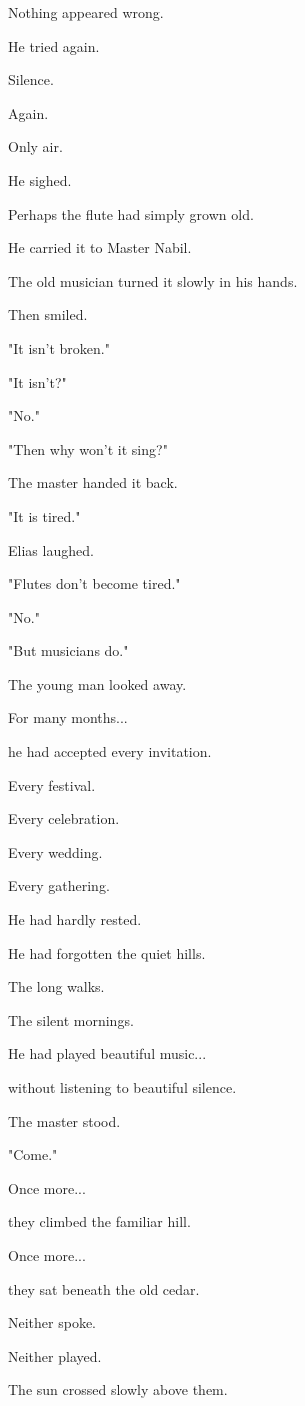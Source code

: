 \documentclass[12pt,openany]{book}
\begin{document}
Nothing appeared wrong.

He tried again.

Silence.

Again.

Only air.

He sighed.

Perhaps the flute had simply grown old.

He carried it to Master Nabil.

The old musician turned it slowly in his hands.

Then smiled.

"It isn't broken."

"It isn't?"

"No."

"Then why won't it sing?"

The master handed it back.

"It is tired."

Elias laughed.

"Flutes don't become tired."

"No."

"But musicians do."

The young man looked away.

For many months...

he had accepted every invitation.

Every festival.

Every celebration.

Every wedding.

Every gathering.

He had hardly rested.

He had forgotten the quiet hills.

The long walks.

The silent mornings.

He had played beautiful music...

without listening to beautiful silence.

The master stood.

"Come."

Once more...

they climbed the familiar hill.

Once more...

they sat beneath the old cedar.

Neither spoke.

Neither played.

The sun crossed slowly above them.
\end{document}
